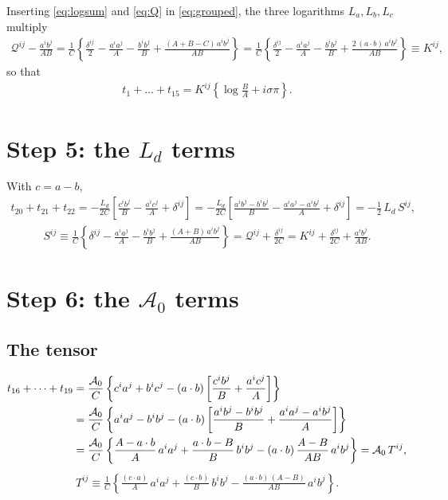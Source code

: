 \documentclass[10pt]{article}
\numberwithin{equation}{section}
\begin{document}
Inserting \eqref{eq:logsum} and \eqref{eq:Q} in \eqref{eq:grouped}, the three logarithms $L_{a},L_{b},L_{c}$ multiply
\begin{align}
\mathcal{Q}^{ij}-\frac{a^{i}b^{j}}{AB}
=\frac{1}{C}\left\{\frac{\delta^{ij}}{2}-\frac{a^{i}a^{j}}{A}-\frac{b^{i}b^{j}}{B}+\frac{(A+B-C)\,a^{i}b^{j}}{AB}\right\}
=\frac{1}{C}\left\{\frac{\delta^{ij}}{2}-\frac{a^{i}a^{j}}{A}-\frac{b^{i}b^{j}}{B}+\frac{2\,(a\cdot b)\,a^{i}b^{j}}{AB}\right\}\equiv K^{ij},
\end{align}
so that
\begin{align}
t_{1}+\dots+t_{15}=K^{ij}\left\{\log\frac{B}{A}+i\sigma\pi\right\}.
\end{align}

\section{Step 5: the $L_{d}$ terms}

With $c=a-b$,
\begin{align}
t_{20}+t_{21}+t_{22}=-\frac{L_{d}}{2C}\left[\frac{c^{i}b^{j}}{B}-\frac{a^{i}c^{j}}{A}+\delta^{ij}\right]
=-\frac{L_{d}}{2C}\left[\frac{a^{i}b^{j}-b^{i}b^{j}}{B}-\frac{a^{i}a^{j}-a^{i}b^{j}}{A}+\delta^{ij}\right]
=-\frac12\,L_{d}\,S^{ij},
\end{align}
\begin{align}
S^{ij}\equiv\frac{1}{C}\left\{\delta^{ij}-\frac{a^{i}a^{j}}{A}-\frac{b^{i}b^{j}}{B}+\frac{(A+B)\,a^{i}b^{j}}{AB}\right\}=\mathcal{Q}^{ij}+\frac{\delta^{ij}}{2C}=K^{ij}+\frac{\delta^{ij}}{2C}+\frac{a^{i}b^{j}}{AB}.
\end{align}

\section{Step 6: the $\mathcal{A}_{0}$ terms}

\subsection{The tensor}
\begin{align}
t_{16}+\dots+t_{19}&=\frac{\mathcal{A}_{0}}{C}\left\{c^{i}a^{j}+b^{i}c^{j}-(a\cdot b)\left[\frac{c^{i}b^{j}}{B}+\frac{a^{i}c^{j}}{A}\right]\right\}\notag\\
&=\frac{\mathcal{A}_{0}}{C}\left\{a^{i}a^{j}-b^{i}b^{j}-(a\cdot b)\left[\frac{a^{i}b^{j}-b^{i}b^{j}}{B}+\frac{a^{i}a^{j}-a^{i}b^{j}}{A}\right]\right\}\notag\\
&=\frac{\mathcal{A}_{0}}{C}\left\{\frac{A-a\cdot b}{A}\,a^{i}a^{j}+\frac{a\cdot b-B}{B}\,b^{i}b^{j}-(a\cdot b)\,\frac{A-B}{AB}\,a^{i}b^{j}\right\}
=\mathcal{A}_{0}\,T^{ij},
\end{align}
\begin{align}
T^{ij}\equiv\frac{1}{C}\left\{\frac{(c\cdot a)}{A}\,a^{i}a^{j}+\frac{(c\cdot b)}{B}\,b^{i}b^{j}-\frac{(a\cdot b)\,(A-B)}{AB}\,a^{i}b^{j}\right\}.
\end{align}
\end{document}
